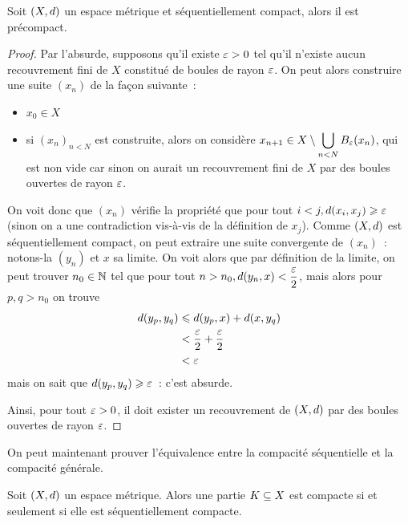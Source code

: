 \begin{lemma}\label{lem.precomp}
  Soit $(X,d)$ un espace métrique et séquentiellement compact, alors il
  est précompact.
\end{lemma}

\begin{proof}
  Par l'absurde, supposons qu'il existe $\varepsilon > 0$ tel qu'il n'existe aucun
  recouvrement fini de $X$ constitué de boules de rayon $\varepsilon$. On peut
  alors construire une suite $(x_n)$ de la façon suivante~:
  \begin{itemize}
  \item $x_0 \in X$
  \item si $(x_n)_{n < N}$ est construite, alors on considère
    $\displaystyle x_{n+1}\in X\setminus \bigcup_{n < N} B_{\varepsilon}(x_n)$,
    qui est non vide car sinon on aurait un recouvrement fini de $X$ par des
    boules ouvertes de rayon $\varepsilon$.
  \end{itemize}
  On voit donc que $(x_n)$ vérifie la propriété que pour tout
  $i < j, d(x_i,x_j) \geqslant \varepsilon$ (sinon on a une contradiction vis-à-vis
  de la définition de $x_j$). Comme $(X,d)$ est séquentiellement compact,
  on peut extraire une suite convergente de $(x_n)$~: notons-la $(y_n)$ et $x$
  sa limite. On voit alors que par définition de la limite, on peut trouver
  $n_0\in\mathbb N$ tel que pour tout
  $n > n_0, d(y_n,x) < \dfrac{\varepsilon}{2}$, mais alors pour $p,q > n_0$ on
  trouve
  \begin{align*}
    d(y_p,y_q) &\leqslant d(y_p,x) + d(x,y_q)\\
    &< \frac\varepsilon 2 + \frac\varepsilon 2\\
    &< \varepsilon
  \end{align*}
  mais on sait que $d(y_p,y_q) \geqslant \varepsilon$~: c'est absurde.

  Ainsi, pour tout $\varepsilon > 0$, il doit exister un recouvrement de
  $(X,d)$ par des boules ouvertes de rayon $\varepsilon$.
\end{proof}

\noindent
On peut maintenant prouver l'équivalence entre la compacité séquentielle et la
compacité générale.

\begin{theorem}
  Soit $(X,d)$ un espace métrique. Alors une partie
  $K\subseteq X$ est compacte si et seulement si elle est séquentiellement
  compacte.
\end{theorem}

